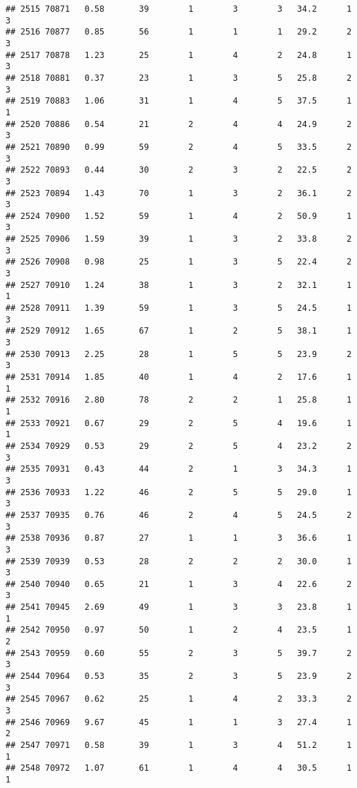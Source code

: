 \documentclass[
]{article}
\begin{document}
\begin{verbatim}
## 2515 70871   0.58       39        1        3        3   34.2      1      3
## 2516 70877   0.85       56        1        1        1   29.2      2      3
## 2517 70878   1.23       25        1        4        2   24.8      1      3
## 2518 70881   0.37       23        1        3        5   25.8      2      3
## 2519 70883   1.06       31        1        4        5   37.5      1      1
## 2520 70886   0.54       21        2        4        4   24.9      2      3
## 2521 70890   0.99       59        2        4        5   33.5      2      3
## 2522 70893   0.44       30        2        3        2   22.5      2      3
## 2523 70894   1.43       70        1        3        2   36.1      2      3
## 2524 70900   1.52       59        1        4        2   50.9      1      3
## 2525 70906   1.59       39        1        3        2   33.8      2      3
## 2526 70908   0.98       25        1        3        5   22.4      2      3
## 2527 70910   1.24       38        1        3        2   32.1      1      1
## 2528 70911   1.39       59        1        3        5   24.5      1      3
## 2529 70912   1.65       67        1        2        5   38.1      1      3
## 2530 70913   2.25       28        1        5        5   23.9      2      3
## 2531 70914   1.85       40        1        4        2   17.6      1      1
## 2532 70916   2.80       78        2        2        1   25.8      1      1
## 2533 70921   0.67       29        2        5        4   19.6      1      1
## 2534 70929   0.53       29        2        5        4   23.2      2      3
## 2535 70931   0.43       44        2        1        3   34.3      1      3
## 2536 70933   1.22       46        2        5        5   29.0      1      3
## 2537 70935   0.76       46        2        4        5   24.5      2      3
## 2538 70936   0.87       27        1        1        3   36.6      1      3
## 2539 70939   0.53       28        2        2        2   30.0      1      3
## 2540 70940   0.65       21        1        3        4   22.6      2      3
## 2541 70945   2.69       49        1        3        3   23.8      1      1
## 2542 70950   0.97       50        1        2        4   23.5      1      2
## 2543 70959   0.60       55        2        3        5   39.7      2      3
## 2544 70964   0.53       35        2        3        5   23.9      2      3
## 2545 70967   0.62       25        1        4        2   33.3      2      3
## 2546 70969   9.67       45        1        1        3   27.4      1      2
## 2547 70971   0.58       39        1        3        4   51.2      1      1
## 2548 70972   1.07       61        1        4        4   30.5      1      1

\end{verbatim}
\end{document}
